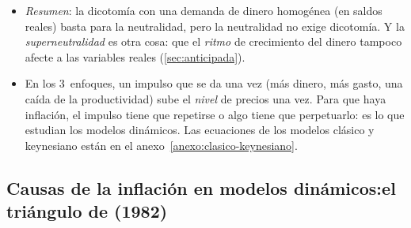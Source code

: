 \documentclass[11pt]{article}
\begin{document}
\begin{anotaciones}
\begin{itemize}
\item \emph{Resumen}: la dicotomía con una demanda de dinero homogénea (en saldos reales) basta para la neutralidad, pero la neutralidad no exige dicotomía. Y la \emph{superneutralidad} es otra cosa: que el \emph{ritmo} de crecimiento del dinero tampoco afecte a las variables reales (\ref{sec:anticipada}).
\end{itemize}
\end{anotaciones}

\begin{itemize}
\item En los 3~enfoques, un impulso que se da una vez (más dinero, más gasto, una caída de la productividad) sube el \emph{nivel} de precios una vez. Para que haya inflación, el impulso tiene que repetirse o algo tiene que perpetuarlo: es lo que estudian los modelos dinámicos. Las ecuaciones de los modelos clásico y keynesiano están en el anexo~\ref{anexo:clasico-keynesiano}.
\end{itemize}

\subsection{Causas de la inflación en modelos dinámicos:\cortetitulo el triángulo de  (1982)}\label{sec:triangulo-gordon}
\end{document}
